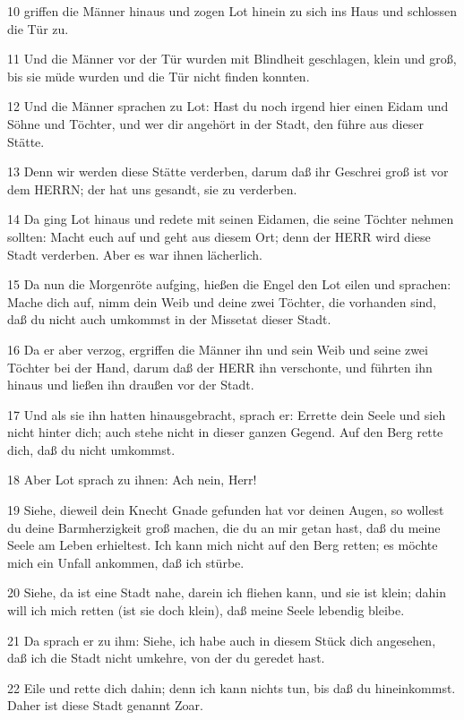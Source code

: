 \par 10 griffen die Männer hinaus und zogen Lot hinein zu sich ins Haus und schlossen die Tür zu.
\par 11 Und die Männer vor der Tür wurden mit Blindheit geschlagen, klein und groß, bis sie müde wurden und die Tür nicht finden konnten.
\par 12 Und die Männer sprachen zu Lot: Hast du noch irgend hier einen Eidam und Söhne und Töchter, und wer dir angehört in der Stadt, den führe aus dieser Stätte.
\par 13 Denn wir werden diese Stätte verderben, darum daß ihr Geschrei groß ist vor dem HERRN; der hat uns gesandt, sie zu verderben.
\par 14 Da ging Lot hinaus und redete mit seinen Eidamen, die seine Töchter nehmen sollten: Macht euch auf und geht aus diesem Ort; denn der HERR wird diese Stadt verderben. Aber es war ihnen lächerlich.
\par 15 Da nun die Morgenröte aufging, hießen die Engel den Lot eilen und sprachen: Mache dich auf, nimm dein Weib und deine zwei Töchter, die vorhanden sind, daß du nicht auch umkommst in der Missetat dieser Stadt.
\par 16 Da er aber verzog, ergriffen die Männer ihn und sein Weib und seine zwei Töchter bei der Hand, darum daß der HERR ihn verschonte, und führten ihn hinaus und ließen ihn draußen vor der Stadt.
\par 17 Und als sie ihn hatten hinausgebracht, sprach er: Errette dein Seele und sieh nicht hinter dich; auch stehe nicht in dieser ganzen Gegend. Auf den Berg rette dich, daß du nicht umkommst.
\par 18 Aber Lot sprach zu ihnen: Ach nein, Herr!
\par 19 Siehe, dieweil dein Knecht Gnade gefunden hat vor deinen Augen, so wollest du deine Barmherzigkeit groß machen, die du an mir getan hast, daß du meine Seele am Leben erhieltest. Ich kann mich nicht auf den Berg retten; es möchte mich ein Unfall ankommen, daß ich stürbe.
\par 20 Siehe, da ist eine Stadt nahe, darein ich fliehen kann, und sie ist klein; dahin will ich mich retten (ist sie doch klein), daß meine Seele lebendig bleibe.
\par 21 Da sprach er zu ihm: Siehe, ich habe auch in diesem Stück dich angesehen, daß ich die Stadt nicht umkehre, von der du geredet hast.
\par 22 Eile und rette dich dahin; denn ich kann nichts tun, bis daß du hineinkommst. Daher ist diese Stadt genannt Zoar.
